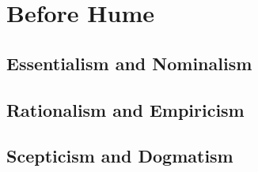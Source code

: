 \section{Before Hume}\label{Before}

\subsection{Essentialism and Nominalism}

\subsection{Rationalism and Empiricism}

\subsection{Scepticism and Dogmatism}
